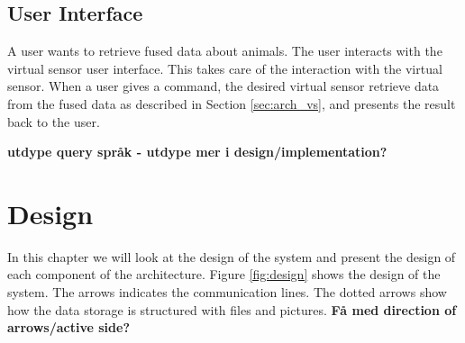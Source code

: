 \documentclass[USenglish]{uit-thesis}
\begin{document}


\section{User Interface} \label{sec:arch_user_int}
A user wants to retrieve fused data about animals. The user interacts with the virtual sensor user interface. This takes care of the interaction with the virtual sensor. When a user gives a command, the desired virtual sensor retrieve data from the fused data as described in Section \ref{sec:arch_vs}, and presents the result back to the user.

\textbf{utdype query språk - utdype mer i design/implementation?}



\chapter{Design}

In this chapter we will look at the design of the system and present the design of each component of the architecture. Figure \ref{fig:design} shows the design of the system. The arrows indicates the communication lines. The dotted arrows show how the data storage is structured with files and pictures. \textbf{Få med direction of arrows/active side?}

\end{document}
